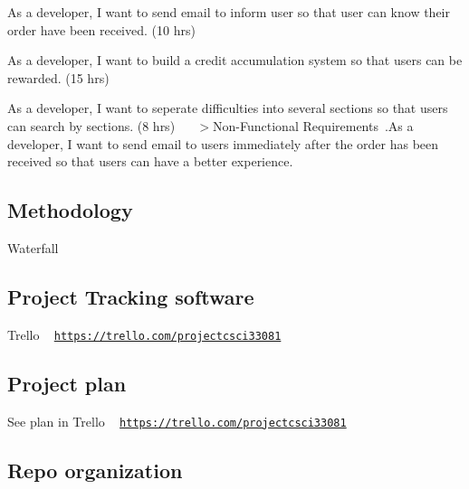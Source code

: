 \begin{DoxyEnumerate}
\item As a developer, I want to send email to inform user so that user can know their order have been received. (10 hrs)~\newline

\item As a developer, I want to build a credit accumulation system so that users can be rewarded. (15 hrs)~\newline

\item As a developer, I want to seperate difficulties into several sections so that users can search by sections. (8 hrs)~\newline
 ~\newline
 $>$Non-\/\+Functional Requirements~.\+As a developer, I want to send email to users immediately after the order has been received so that users can have a better experience.~\newline
 ~\newline

\end{DoxyEnumerate}

\subsection*{Methodology}

Waterfall~\newline
 \subsection*{Project Tracking software}

Trello ~\newline
 \href{https://trello.com/projectcsci33081}{\tt https\+://trello.\+com/projectcsci33081} ~\newline
 \subsection*{Project plan~\newline
}

See plan in Trello ~\newline
 \href{https://trello.com/projectcsci33081}{\tt https\+://trello.\+com/projectcsci33081} ~\newline
 \subsection*{Repo organization~\newline
}

